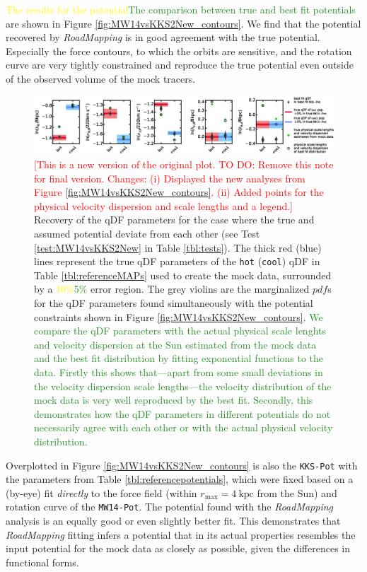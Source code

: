 \documentclass[iop,revtex4,numberedappendix,appendixfloats]{emulateapj}
\newcommand{\pdf}{\ensuremath{pdf}}
\newcommand{\RM}{{\sl RoadMapping}}
\newcommand{\NEW}[1]{\textcolor{ForestGreen}{#1}}
\newcommand{\OLD}[1]{\textcolor{Yellow}{#1}}%
\newcommand{\NOTE}[1]{\textcolor{Red}{#1}}
\begin{document}
\OLD{The results for the potential}\NEW{The comparison between true and best fit potentials} are shown in Figure \ref{fig:MW14vsKKS2New_contours}. We find that the potential recovered by \RM{} is in good agreement with the true potential. Especially the force contours, to which the orbits are sensitive, and the rotation curve are very tightly constrained and reproduce the true potential even outside of the observed volume of the mock tracers.

\begin{figure}[!htb]
\includegraphics[width=1\textwidth]{figs/MW14vsKKS2New_violins.eps}
\caption{\NOTE{[This is a new version of the original plot. TO DO: Remove this note for final version. Changes: (i) Displayed the new analyses from Figure \ref{fig:MW14vsKKS2New_contours}. (ii) Added points for the physical velocity dispersion and scale lengths and a legend.]} Recovery of the qDF parameters for the case where the true and assumed potential deviate from each other (see Test \ref{test:MW14vsKKS2New} in Table \ref{tbl:tests}). The thick red (blue) lines represent the true qDF parameters of the \texttt{hot} (\texttt{cool}) qDF in Table \ref{tbl:referenceMAPs} used to create the mock data, surrounded by a \OLD{10\%}\NEW{5\%} error region. The grey violins are the marginalized \pdf{}s for the qDF parameters found simultaneously with the potential constraints shown in Figure \ref{fig:MW14vsKKS2New_contours}. \NEW{We compare the qDF parameters with the actual physical scale lenghts and velocity dispersion at the Sun estimated from the mock data and the best fit distribution by fitting exponential functions to the data. Firstly this shows that---apart from some small deviations in the velocity dispersion scale lengths---the velocity distribution of the mock data is very well reproduced by the best fit. Secondly, this demonstrates how the qDF parameters in different potentials do not necessarily agree with each other or with the actual physical velocity distribution.}}
\label{fig:MW14vsKKS2New_violins}
\end{figure}

Overplotted in Figure \ref{fig:MW14vsKKS2New_contours} is also the \texttt{KKS-Pot} with the parameters from Table \ref{tbl:referencepotentials}, which were fixed based on a (by-eye) fit \emph{directly} to the force field (within $r_\text{max}=4~\text{kpc}$ from the Sun) and rotation curve of the \texttt{MW14-Pot}. The potential found with the \RM{} analysis is an equally good or even slightly better fit. This demonstrates that \RM{} fitting infers a potential that in its actual properties resembles the input potential for the mock data as closely as possible, given the differences in functional forms.
\end{document}
